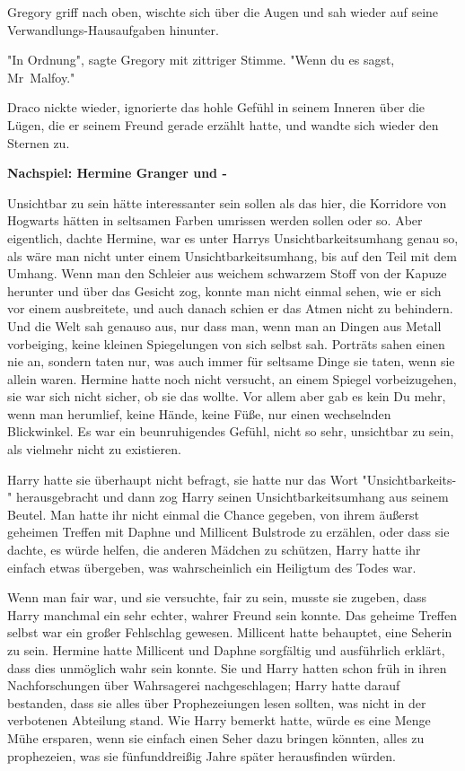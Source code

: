 {Gregory griff nach oben, wischte sich über die Augen und sah wieder auf seine Verwandlungs-Hausaufgaben hinunter.

"In Ordnung", sagte Gregory mit zittriger Stimme. "Wenn du es sagst, Mr~Malfoy."

Draco nickte wieder, ignorierte das hohle Gefühl in seinem Inneren über die Lügen, die er seinem Freund gerade erzählt hatte, und wandte sich wieder den Sternen zu.

\textbf{Nachspiel: Hermine Granger und -}

Unsichtbar zu sein hätte interessanter sein sollen als das hier, die Korridore von Hogwarts hätten in seltsamen Farben umrissen werden sollen oder so. Aber eigentlich, dachte Hermine, war es unter Harrys Unsichtbarkeitsumhang genau so, als wäre man nicht unter einem Unsichtbarkeitsumhang, bis auf den Teil mit dem Umhang. Wenn man den Schleier aus weichem schwarzem Stoff von der Kapuze herunter und über das Gesicht zog, konnte man nicht einmal sehen, wie er sich vor einem ausbreitete, und auch danach schien er das Atmen nicht zu behindern. Und die Welt sah genauso aus, nur dass man, wenn man an Dingen aus Metall vorbeiging, keine kleinen Spiegelungen von sich selbst sah. Porträts sahen einen nie an, sondern taten nur, was auch immer für seltsame Dinge sie taten, wenn sie allein waren. Hermine hatte noch nicht versucht, an einem Spiegel vorbeizugehen, sie war sich nicht sicher, ob sie das wollte. Vor allem aber gab es kein Du mehr, wenn man herumlief, keine Hände, keine Füße, nur einen wechselnden Blickwinkel. Es war ein beunruhigendes Gefühl, nicht so sehr, unsichtbar zu sein, als vielmehr nicht zu existieren.

Harry hatte sie überhaupt nicht befragt, sie hatte nur das Wort "Unsichtbarkeits-" herausgebracht und dann zog Harry seinen Unsichtbarkeitsumhang aus seinem Beutel. Man hatte ihr nicht einmal die Chance gegeben, von ihrem äußerst geheimen Treffen mit Daphne und Millicent Bulstrode zu erzählen, oder dass sie dachte, es würde helfen, die anderen Mädchen zu schützen, Harry hatte ihr einfach etwas übergeben, was wahrscheinlich ein Heiligtum des Todes war.

Wenn man fair war, und sie versuchte, fair zu sein, musste sie zugeben, dass Harry manchmal ein sehr echter, wahrer Freund sein konnte. Das geheime Treffen selbst war ein großer Fehlschlag gewesen. Millicent hatte behauptet, eine Seherin zu sein. Hermine hatte Millicent und Daphne sorgfältig und ausführlich erklärt, dass dies unmöglich wahr sein konnte. Sie und Harry hatten schon früh in ihren Nachforschungen über Wahrsagerei nachgeschlagen; Harry hatte darauf bestanden, dass sie alles über Prophezeiungen lesen sollten, was nicht in der verbotenen Abteilung stand. Wie Harry bemerkt hatte, würde es eine Menge Mühe ersparen, wenn sie einfach einen Seher dazu bringen könnten, alles zu prophezeien, was sie fünfunddreißig Jahre später herausfinden würden.

}

